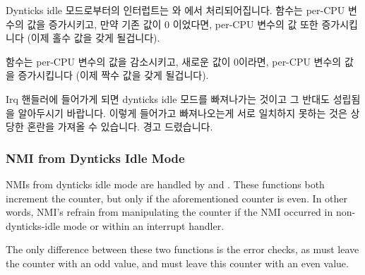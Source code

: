 Dynticks idle 모드로부터의 인터럽트는  와
 에서 처리되어집니다.
 함수는 per-CPU  변수의 값을
증가시키고, 만약 기존 값이 0 이었다면,  per-CPU 변수의 값 또한
증가시킵니다 (이제 홀수 값을 갖게 될겁니다).

 함수는 per-CPU  변수의 값을
감소시키고, 새로운 값이 0이라면,  per-CPU 변수의 값을 증가시킵니다
(이제 짝수 값을 갖게 될겁니다).

Irq 핸들러에 들어가게 되면 dynticks idle 모드를 빠져나가는 것이고 그 반대도
성립됨을 알아두시기 바랍니다.
이렇게 들어가고 빠져나오는게 서로 일치하지 못하는 것은 상당한 혼란을 가져올 수
있습니다.
경고 드렸습니다.
\iffalse

Interrupts from dynticks idle mode are handled by
\co{rcu_irq_enter()} and \co{rcu_irq_exit()}.
The \co{rcu_irq_enter()} function increments the
per-CPU \co{dynticks_nesting} variable, and, if the prior
value was zero, also increments the \co{dynticks}
per-CPU variable (which must then have an odd-numbered value).

The \co{rcu_irq_exit()} function decrements the
per-CPU \co{dynticks_nesting} variable, and, if the new
value is zero, also increments the \co{dynticks}
per-CPU variable (which must then have an even-numbered value).

Note that entering an irq handler exits dynticks idle mode
and vice versa.
This enter/exit anti-correspondence can cause much confusion.
You have been warned.
\fi

\subsubsection{NMI from Dynticks Idle Mode}
\label{app:rcuimpl:rcutree:NMI from Dynticks Idle Mode}

NMIs from dynticks idle mode are handled by 
and .
These functions both increment the  counter,
but only if the aforementioned  counter is even.
In other words, NMI's refrain from manipulating the
 counter if the NMI occurred in non-dynticks-idle
mode or within an interrupt handler.

The only difference between these two functions is the error checks,
as  must leave the 
counter with an odd value, and  must leave
this counter with an even value.

